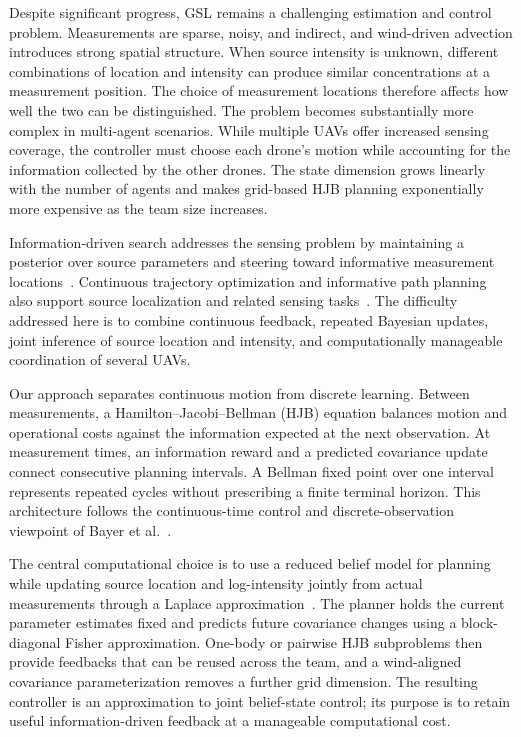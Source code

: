 \documentclass{article}
\begin{document}
Despite significant progress, GSL remains a challenging estimation and control problem.
Measurements are sparse, noisy, and indirect, and wind-driven advection introduces strong spatial structure.
When source intensity is unknown, different combinations of location and intensity can produce similar concentrations at a measurement position.
The choice of measurement locations therefore affects how well the two can be distinguished.
The problem becomes substantially more complex in multi-agent scenarios.
While multiple UAVs offer increased sensing coverage, the controller must choose each drone's motion while accounting for the information collected by the other drones.
The state dimension grows linearly with the number of agents and makes grid-based HJB planning exponentially more expensive as the team size increases.

Information-driven search addresses the sensing problem by maintaining a posterior over source parameters and steering toward informative measurement locations~\cite{vergassola2007infotaxis,hutchinson2019control,chen2021dcee}.
Continuous trajectory optimization and informative path planning also support source localization and related sensing tasks~\cite{charrow2015information,jin2024sense,jin2025cumulative}.
The difficulty addressed here is to combine continuous feedback, repeated Bayesian updates, joint inference of source location and intensity, and computationally manageable coordination of several UAVs.

Our approach separates continuous motion from discrete learning.
Between measurements, a Hamilton--Jacobi--Bellman (HJB) equation balances motion and operational costs against the information expected at the next observation.
At measurement times, an information reward and a predicted covariance update connect consecutive planning intervals.
A Bellman fixed point over one interval represents repeated cycles without prescribing a finite terminal horizon.
This architecture follows the continuous-time control and discrete-observation viewpoint of Bayer et al.~\cite{bayer2024continuous}.

The central computational choice is to use a reduced belief model for planning while updating source location and log-intensity jointly from actual measurements through a Laplace approximation~\cite{laplace_approx,long2013fast}.
The planner holds the current parameter estimates fixed and predicts future covariance changes using a block-diagonal Fisher approximation.
One-body or pairwise HJB subproblems then provide feedbacks that can be reused across the team, and a wind-aligned covariance parameterization removes a further grid dimension.
The resulting controller is an approximation to joint belief-state control; its purpose is to retain useful information-driven feedback at a manageable computational cost.
\end{document}
